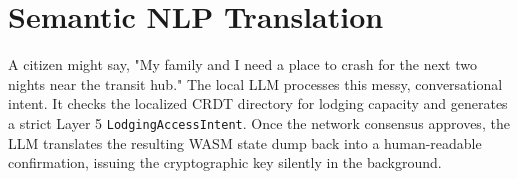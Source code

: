 \section{Semantic NLP Translation}
A citizen might say, "My family and I need a place to crash for the next two nights near the transit hub." The local LLM processes this messy, conversational intent. It checks the localized CRDT directory for lodging capacity and generates a strict Layer 5 \texttt{LodgingAccessIntent}. Once the network consensus approves, the LLM translates the resulting WASM state dump back into a human-readable confirmation, issuing the cryptographic key silently in the background.

